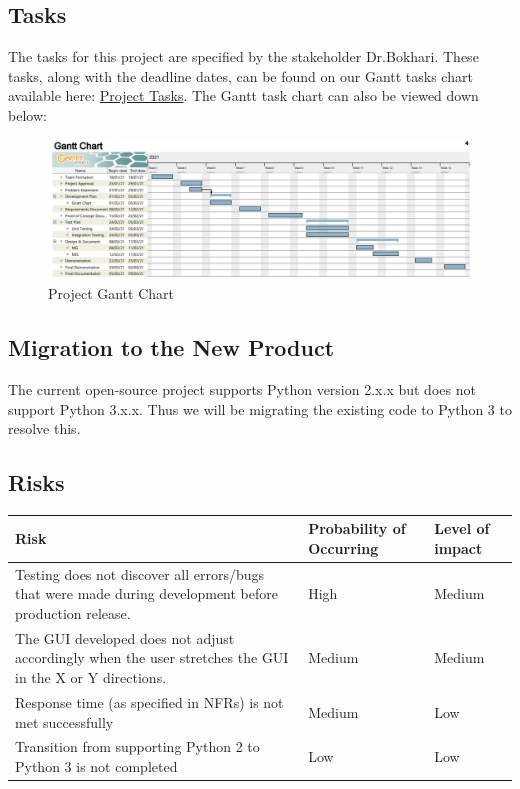 \documentclass[12pt, titlepage]{article}
\begin{document}
\subsection{Tasks}
The tasks for this project are specified by the stakeholder Dr.Bokhari. These tasks, along with the deadline dates, can be found on our Gantt tasks chart available here: \href{https://gitlab.cas.mcmaster.ca/bargea/3xa3-g09-2021/-/blob/master/BlankProjectTemplate/ProjectSchedule/3XA3\%20Group\%20Project.pdf}{Project Tasks}. The Gantt task chart can also be viewed down below: 
\begin{figure}[h]
    \centering
    \includegraphics[scale=0.55]{GanttChart}
    \caption{Project Gantt Chart}
    \label{fig:GanttChart}
\end{figure}


\subsection{Migration to the New Product}
The current open-source project supports Python version 2.x.x but does not support Python 3.x.x. Thus we will be migrating the existing code to Python 3 to resolve this.

\newpage
\subsection{Risks}
\begin{table}[h!]
\centering
\begin{tabular}{ |p{7cm}|p{3cm}|p{3cm}| } 
\hline
Risk & Probability of Occurring & Level of impact \\
\hline
Testing does not discover all errors/bugs that were made during development before production release. & High & Medium \\ 
\hline
The GUI developed does not adjust accordingly when the user stretches the GUI in the X or Y directions. & Medium & Medium \\
\hline
Response time (as specified in NFRs) is not met successfully & Medium & Low \\ 
\hline
Transition from supporting Python 2 to Python 3 is not completed & Low & Low \\ 
\hline
\end{tabular}
\end{table}
\end{document}
